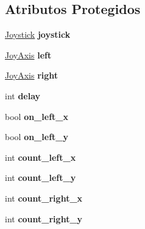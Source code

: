 \subsection*{Atributos Protegidos}
\begin{DoxyCompactItemize}
\item 
\hyperlink{classJoystick}{Joystick} {\bfseries joystick}\hypertarget{classDualshock3_afe8ae7a4544874f74368e6c9c82ecc12}{}\label{classDualshock3_afe8ae7a4544874f74368e6c9c82ecc12}

\item 
\hyperlink{structJoyAxis}{Joy\+Axis} {\bfseries left}\hypertarget{classDualshock3_af7bc60ab63a4b717ab318de87b8f34ba}{}\label{classDualshock3_af7bc60ab63a4b717ab318de87b8f34ba}

\item 
\hyperlink{structJoyAxis}{Joy\+Axis} {\bfseries right}\hypertarget{classDualshock3_ab128dd51545e9ebeee8dcf0def2c74f3}{}\label{classDualshock3_ab128dd51545e9ebeee8dcf0def2c74f3}

\item 
int {\bfseries delay}\hypertarget{classDualshock3_a3452917ac09a568c89147dc8316facdc}{}\label{classDualshock3_a3452917ac09a568c89147dc8316facdc}

\item 
bool {\bfseries on\+\_\+left\+\_\+x}\hypertarget{classDualshock3_a3e264cba8285d1f5240122e1f6f1889a}{}\label{classDualshock3_a3e264cba8285d1f5240122e1f6f1889a}

\item 
bool {\bfseries on\+\_\+left\+\_\+y}\hypertarget{classDualshock3_a10c680818248af57bb5dd2acff51c5d2}{}\label{classDualshock3_a10c680818248af57bb5dd2acff51c5d2}

\item 
int {\bfseries count\+\_\+left\+\_\+x}\hypertarget{classDualshock3_a2a3408a25c71f57f5188ba2f158cf00e}{}\label{classDualshock3_a2a3408a25c71f57f5188ba2f158cf00e}

\item 
int {\bfseries count\+\_\+left\+\_\+y}\hypertarget{classDualshock3_ada5b0bff015d6fcd47d560a3e35071c8}{}\label{classDualshock3_ada5b0bff015d6fcd47d560a3e35071c8}

\item 
int {\bfseries count\+\_\+right\+\_\+x}\hypertarget{classDualshock3_aab3f031ea514b4c1ad3171d24da45a68}{}\label{classDualshock3_aab3f031ea514b4c1ad3171d24da45a68}

\item 
int {\bfseries count\+\_\+right\+\_\+y}\hypertarget{classDualshock3_a351b6dd4b2564bf77451a7fd64aaf380}{}\label{classDualshock3_a351b6dd4b2564bf77451a7fd64aaf380}


\end{DoxyCompactItemize}
